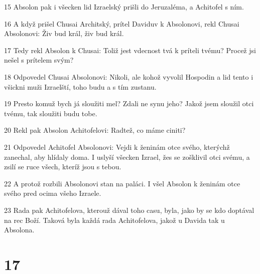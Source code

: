\par 15 Absolon pak i všecken lid Izraelský prišli do Jeruzaléma, a Achitofel s ním.
\par 16 A když prišel Chusai Architský, prítel Daviduv k Absolonovi, rekl Chusai Absolonovi: Živ bud král, živ bud král.
\par 17 Tedy rekl Absolon k Chusai: Toliž jest vdecnost tvá k príteli tvému? Procež jsi nešel s prítelem svým?
\par 18 Odpovedel Chusai Absolonovi: Nikoli, ale kohož vyvolil Hospodin a lid tento i všickni muži Izraelští, toho budu a s tím zustanu.
\par 19 Presto komuž bych já sloužiti mel? Zdali ne synu jeho? Jakož jsem sloužil otci tvému, tak sloužiti budu tobe.
\par 20 Rekl pak Absolon Achitofelovi: Radtež, co máme ciniti?
\par 21 Odpovedel Achitofel Absolonovi: Vejdi k ženinám otce svého, kterýchž zanechal, aby hlídaly doma. I uslyší všecken Izrael, žes se zošklivil otci svému, a zsilí se ruce všech, kteríž jsou s tebou.
\par 22 A protož rozbili Absolonovi stan na paláci. I všel Absolon k ženinám otce svého pred ocima všeho Izraele.
\par 23 Rada pak Achitofelova, kterouž dával toho casu, byla, jako by se kdo doptával na rec Boží. Taková byla každá rada Achitofelova, jakož u Davida tak u Absolona.

\chapter{17}

